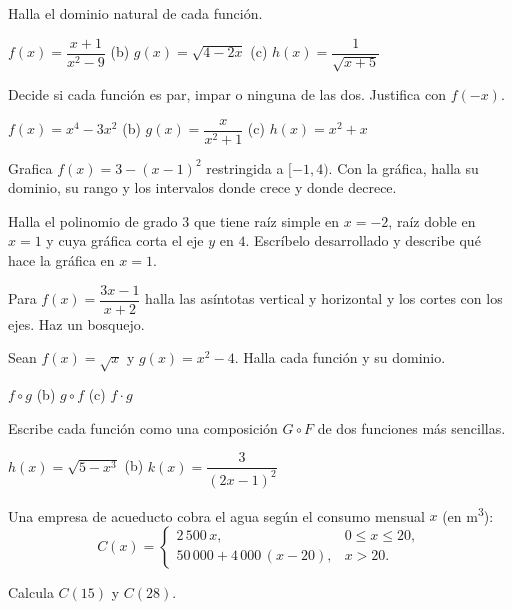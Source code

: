 \documentclass[11pt,a4paper]{article}
\begin{document}
\taller
\begin{ejercicios}
\item Halla el dominio natural de cada función.
  \begin{ejercicios}
  \item $f(x)=\dfrac{x+1}{x^2-9}$ \qquad (b) $g(x)=\sqrt{4-2x}$ \qquad (c) $h(x)=\dfrac{1}{\sqrt{x+5}}$
  \end{ejercicios}
\item Decide si cada función es par, impar o ninguna de las dos. Justifica con $f(-x)$.
  \begin{ejercicios}
  \item $f(x)=x^4-3x^2$ \qquad (b) $g(x)=\dfrac{x}{x^2+1}$ \qquad (c) $h(x)=x^2+x$
  \end{ejercicios}
\item Grafica $f(x)=3-(x-1)^2$ restringida a $[-1,4)$. Con la gráfica, halla su dominio, su rango y los intervalos
  donde crece y donde decrece.
\item Halla el polinomio de grado $3$ que tiene raíz simple en $x=-2$, raíz doble en $x=1$ y cuya gráfica corta el eje
  $y$ en $4$. Escríbelo desarrollado y describe qué hace la gráfica en $x=1$.
\item Para $f(x)=\dfrac{3x-1}{x+2}$ halla las asíntotas vertical y horizontal y los cortes con los ejes. Haz un bosquejo.
\item Sean $f(x)=\sqrt{x}$ y $g(x)=x^2-4$. Halla cada función y su dominio.
  \begin{ejercicios}
  \item $f\circ g$ \qquad (b) $g\circ f$ \qquad (c) $f\cdot g$
  \end{ejercicios}
\item Escribe cada función como una composición $G\circ F$ de dos funciones más sencillas.
  \begin{ejercicios}
  \item $h(x)=\sqrt{5-x^3}$ \qquad (b) $k(x)=\dfrac{3}{(2x-1)^2}$
  \end{ejercicios}
\item Una empresa de acueducto cobra el agua según el consumo mensual $x$ (en \si{\cubic\metre}):
  \[ C(x)=\begin{cases} 2\,500\,x, & 0\le x\le 20,\\ 50\,000+4\,000\,(x-20), & x>20.\end{cases} \]
  \begin{ejercicios}
  \item Calcula $C(15)$ y $C(28)$.

\end{ejercicios}
\end{ejercicios}
\end{document}
